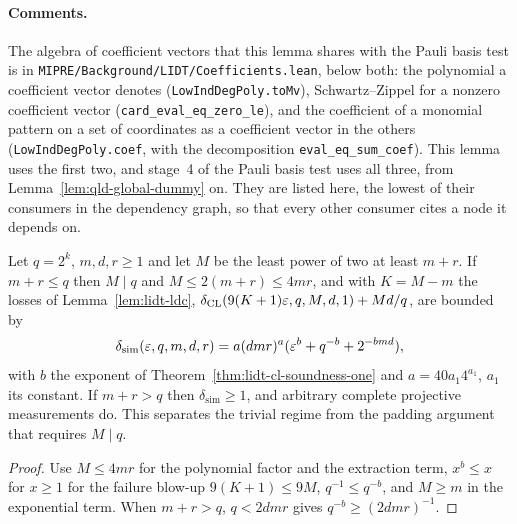 \paragraph{Comments.} The algebra of coefficient vectors that this lemma shares with the Pauli basis
test is in \texttt{MIPRE/Background/LIDT/Coefficients.lean}, below both: the polynomial a
coefficient vector denotes (\texttt{LowIndDegPoly.toMv}), Schwartz--Zippel for a nonzero
coefficient vector (\texttt{card\_eval\_eq\_zero\_le}), and the coefficient of a monomial pattern
on a set of coordinates as a coefficient vector in the others (\texttt{LowIndDegPoly.coef}, with the
decomposition \texttt{eval\_eq\_sum\_coef}). This lemma uses the first two, and stage~4 of the
Pauli basis test uses all three, from Lemma~\ref{lem:qld-global-dummy} on. They are listed here,
the lowest of their consumers in the dependency graph, so that every other consumer cites a node it
depends on.

\begin{lemma}
\label{lem:lidt-ldc-error}
\leanok
Let $q=2^k$, $m,d,r\geq1$ and let $M$ be the least power of two at least $m+r$. If
$m+r\leq q$ then $M\mid q$ and $M\leq2(m+r)\leq4mr$, and with $K=M-m$ the losses of
Lemma~\ref{lem:lidt-ldc}, $\delta_{\mathrm{CL}}(9(K+1)\varepsilon,q,M,d,1)+Md/q$, are bounded by
\[
  \delta_{\mathrm{sim}}(\varepsilon,q,m,d,r)=a(dmr)^a(\varepsilon^b+q^{-b}+2^{-bmd}),
\]
with $b$ the exponent of Theorem~\ref{thm:lidt-cl-soundness-one} and $a=40a_1 4^{a_1}$, $a_1$ its
constant. If $m+r>q$ then $\delta_{\mathrm{sim}}\geq1$, and arbitrary complete projective
measurements do. This separates the trivial regime from the padding argument that requires
$M\mid q$.
\end{lemma}

\begin{proof}
\leanok
Use $M\leq4mr$ for the polynomial factor and the extraction term, $x^b\leq x$ for $x\geq1$ for
the failure blow-up $9(K+1)\leq9M$, $q^{-1}\leq q^{-b}$, and $M\geq m$ in the exponential term.
When $m+r>q$, $q<2dmr$ gives $q^{-b}\geq(2dmr)^{-1}$.
\end{proof}

